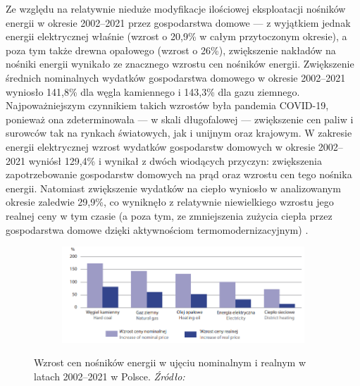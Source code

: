 \documentclass[polish, twoside, 12pt, a4paper]{article}
\theoremstyle{definition}
\theoremstyle{plain}
\theoremstyle{remark}
\begin{document}
Ze względu na relatywnie nieduże modyfikacje ilościowej eksploatacji nośników energii w okresie 2002--2021 przez gospodarstwa domowe --- z wyjątkiem jednak energii elektrycznej właśnie (wzrost o 20,9\% w całym przytoczonym okresie), a poza tym także drewna opałowego (wzrost o 26\%), zwiększenie nakładów na nośniki energii wynikało ze znacznego wzrostu cen nośników energii. Zwiększenie średnich nominalnych wydatków gospodarstwa domowego w okresie 2002--2021 wyniosło 141,8\% dla węgla kamiennego i 143,3\% dla gazu ziemnego. Najpoważniejszym czynnikiem takich wzrostów była pandemia COVID-19, ponieważ ona zdeterminowała --- w skali długofalowej --- zwiększenie cen paliw i surowców tak na rynkach światowych, jak i unijnym oraz krajowym. W zakresie energii elektrycznej wzrost wydatków gospodarstw domowych w okresie 2002--2021 wyniósł 129,4\% i wynikał z dwóch wiodących przyczyn: zwiększenia zapotrzebowanie gospodarstw domowych na prąd oraz wzrostu cen tego nośnika energii. Natomiast zwiększenie wydatków na ciepło wyniosło w analizowanym okresie zaledwie 29,9\%, co wyniknęło z relatywnie niewielkiego wzrostu jego realnej ceny w tym czasie (a poza tym, ze zmniejszenia zużycia ciepła przez gospodarstwa domowe dzięki aktywnościom termomodernizacyjnym) \parencite{gus2023}. 

\begin{figure}[hbt]
  \centering

  \begin{subfigure}[t]{0.45\textwidth}
    \hspace{-1.7cm}
    \includegraphics[width=1.43\textwidth]{./out_figures/figure_10}
  \end{subfigure}

  \captionsetup{margin=10pt,font=small,labelfont=bf,width=.8\textwidth}

  \caption[Wzrost cen nośników energii w ujęciu nominalnym i realnym w latach 2002--2021 w Polsce.]{Wzrost cen nośników energii w ujęciu nominalnym i realnym w latach 2002--2021 w Polsce. \textit{Źródło:} \cite{gus2023}}\label{fig:x10}
\end{figure}
\end{document}
